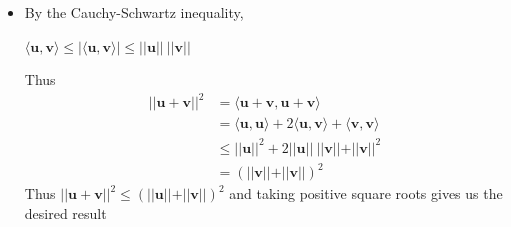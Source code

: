 \documentclass{report}
\begin{document}
\begin{myproof}
\begin{itemize}
            \[
            \begin{aligned}
                0  & \le \vert \vert \mathbf{u} \vert \vert ^2 - 2 \mathrm{Re} \bigg ( \frac{ \vert \langle \mathbf{v}, \mathbf{u} \rangle \vert ^2 }{\vert \vert \mathbf{v} \vert \vert ^2} \bigg ) + \frac{\vert \langle \mathbf{v}, \mathbf{u} \rangle \vert ^2}{\vert \vert \mathbf{v} \vert \vert ^4} \vert \vert \mathbf{v} \vert \vert ^2 \\
                 & = \vert \vert \mathbf{u} \vert \vert ^2 - \frac{\vert \langle \mathbf{v}, \mathbf{u} \rangle \vert ^2}{\vert \vert \mathbf{v} \vert \vert^2}
            \end{aligned}
            \]
        Thus we have
        \[
        \begin{aligned}
            0 \le \vert \vert \mathbf{u} \vert \vert ^2 \vert \vert \mathbf{v} \vert \vert ^2 - \vert \langle \mathbf{v}, \mathbf{u} \rangle \vert ^2  & \iff \vert \langle \mathbf{u}, \mathbf{v} \rangle \vert ^2 = \vert \langle \mathbf{v}, \mathbf{u} \rangle \vert ^2 \le \vert \vert \mathbf{u} \vert \vert ^2 \vert \vert \mathbf{v} \vert \vert ^2
        \end{aligned}
        \]
        Taking positive square roots gives the required answer
    \item By the Cauchy-Schwartz inequality, \\ 
\begin{center}
    $ \langle \mathbf{u}, \mathbf{v} \rangle \le \vert \langle \mathbf{u}, \mathbf{v} \rangle \vert \le \vert \vert \mathbf{u} \vert \vert \ \vert \vert \mathbf{v} \vert \vert$
\end{center}
Thus
\[
\begin{aligned}
    \vert \vert \mathbf{u} + \mathbf{v} \vert \vert ^2  & = \langle \mathbf{u} + \mathbf{v}, \mathbf{u} + \mathbf{v} \rangle \\
     &  = \langle \mathbf{u}, \mathbf{u} \rangle + 2 \langle \mathbf{u}, \mathbf{v} \rangle + \langle \mathbf{v}, \mathbf{v} \rangle \\
      & \le \vert \vert \mathbf{u} \vert \vert ^2 + 2 \vert \vert \mathbf{u} \vert \vert \ \vert \vert \mathbf{v} \vert \vert + \vert \vert \mathbf{v} \vert \vert ^2 \\
       & = \left( \vert \vert \mathbf{v} \vert \vert + \vert \vert \mathbf{v} \vert \vert \right)^2 
\end{aligned}
\]
Thus $\vert \vert \mathbf{u} + \mathbf{v} \vert \vert ^2 \le \left( \vert \vert \mathbf{u} \vert \vert + \vert \vert \mathbf{v} \vert \vert \right)^2 $ and taking positive square roots gives us the desired
result
\end{itemize}
\end{myproof}
\end{document}
